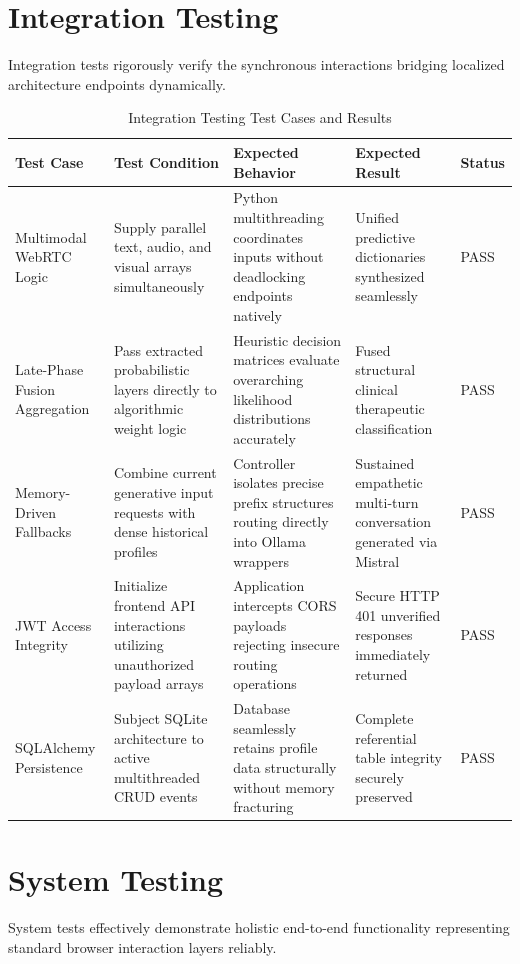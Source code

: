 \documentclass[11pt]{report}
\begin{document}
\section{Integration Testing}
Integration tests rigorously verify the synchronous interactions bridging localized architecture endpoints dynamically.

\begin{table}[H]
    \centering
    \caption{Integration Testing Test Cases and Results}
    \label{tab:integration_testing}
    \begin{tabular}{|p{3cm}|p{3.5cm}|p{3.5cm}|p{3cm}|p{1.3cm}|}
        \hline
        Test Case & Test Condition & Expected Behavior & Expected Result & Status \\ \hline
        Multimodal WebRTC Logic & Supply parallel text, audio, and visual arrays simultaneously & Python multithreading coordinates inputs without deadlocking endpoints natively & Unified predictive dictionaries synthesized seamlessly & PASS \\ \hline
        Late-Phase Fusion Aggregation & Pass extracted probabilistic layers directly to algorithmic weight logic & Heuristic decision matrices evaluate overarching likelihood distributions accurately & Fused structural clinical therapeutic classification & PASS \\ \hline
        Memory-Driven Fallbacks & Combine current generative input requests with dense historical profiles & Controller isolates precise prefix structures routing directly into Ollama wrappers & Sustained empathetic multi-turn conversation generated via Mistral & PASS \\ \hline
        JWT Access Integrity & Initialize frontend API interactions utilizing unauthorized payload arrays & Application intercepts CORS payloads rejecting insecure routing operations & Secure HTTP 401 unverified responses immediately returned & PASS \\ \hline
        SQLAlchemy Persistence & Subject SQLite architecture to active multithreaded CRUD events & Database seamlessly retains profile data structurally without memory fracturing & Complete referential table integrity securely preserved & PASS \\ \hline
    \end{tabular}
\end{table}

\section{System Testing}
System tests effectively demonstrate holistic end-to-end functionality representing standard browser interaction layers reliably.
\end{document}
